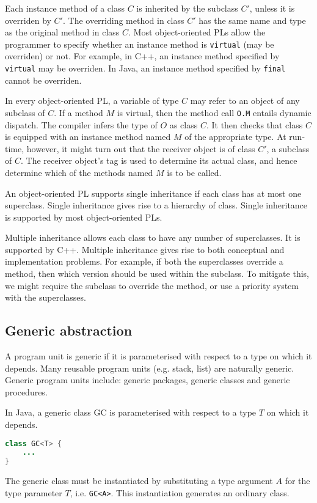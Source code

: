 \documentclass[a4paper, openany]{memoir}
\begin{document}
Each instance method of a class $C$ is inherited by the subclass $C'$, unless it is overriden by $C'$. The overriding method in class $C'$ has the same name and type as the original method in class $C$. Most object-oriented PLs allow the programmer to specify whether an instance method is \texttt{virtual} (may be overriden) or not. For example, in C++, an instance method specified by \texttt{virtual} may be overriden. In Java, an instance method specified by \texttt{final} cannot be overriden.

In every object-oriented PL, a variable of type $C$ may refer to an object of any subclass of $C$. If a method $M$ is virtual, then the method call \texttt{O.M} entails dynamic dispatch. The compiler infers the type of $O$ as class $C$. It then checks that class $C$ is equipped with an instance method named $M$ of the appropriate type. At run-time, however, it might turn out that the receiver object is of class $C'$, a subclass of $C$. The receiver object's tag is used to determine its actual class, and hence determine which of the methods named $M$ is to be called.

An object-oriented PL supports single inheritance if each class has at most one superclass. Single inheritance gives rise to a hierarchy of class. Single inheritance is supported by most object-oriented PLs. 

Multiple inheritance allows each class to have any number of superclasses. It is supported by C++. Multiple inheritance gives rise to both conceptual and implementation problems. For example, if both the superclasses override a method, then which version should be used within the subclass. To mitigate this, we might require the subclass to override the method, or use a priority system with the superclasses.

\subsection{Generic abstraction}
A program unit is generic if it is parameterised with respect to a type on which it depends. Many reusable program units (e.g. stack, list) are naturally generic. Generic program units include: generic packages, generic classes and generic procedures.

In Java, a generic class GC is parameterised with respect to a type $T$ on which it depends.
\begin{lstlisting}[language=Java]
class GC<T> {
    ...
}
\end{lstlisting}
The generic class must be instantiated by substituting a type argument $A$ for the type parameter $T$, i.e. \texttt{GC<A>}. This instantiation generates an ordinary class.
\end{document}
